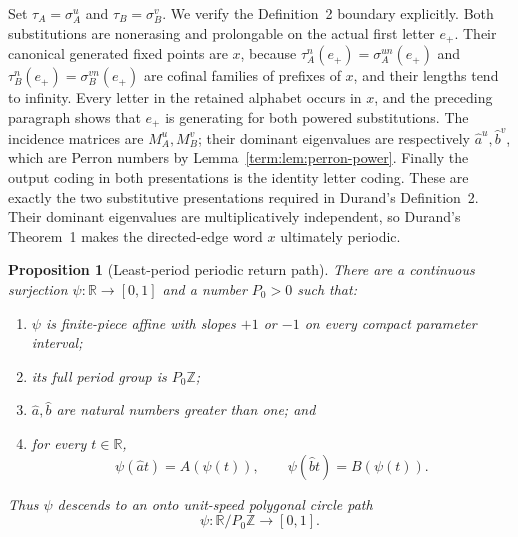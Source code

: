 \documentclass[11pt]{article}
\newtheorem{proposition}[theorem]{Proposition}
\theoremstyle{definition}
\theoremstyle{remark}
\newcommand{\I}{[0,1]}
\begin{document}
Set \(\tau_A=\sigma_A^u\) and \(\tau_B=\sigma_B^v\).  We verify the
Definition~2 boundary explicitly.  Both substitutions are nonerasing and
prolongable on the actual first letter \(e_+\).  Their canonical generated
fixed points are \(x\), because \(\tau_A^n(e_+)=\sigma_A^{un}(e_+)\) and
\(\tau_B^n(e_+)=\sigma_B^{vn}(e_+)\) are cofinal families of prefixes of
\(x\), and their lengths tend to infinity.  Every letter in the retained
alphabet occurs in \(x\), and the preceding paragraph shows that \(e_+\) is
generating for both powered substitutions.  The incidence matrices are
\(M_A^u,M_B^v\); their dominant eigenvalues are respectively
\(\widehat a^u,\widehat b^v\), which are Perron numbers by
Lemma~\ref{term:lem:perron-power}.  Finally the output coding in both
presentations is the identity letter coding.  These are exactly the two
substitutive presentations required in Durand's Definition~2.  Their
dominant eigenvalues are multiplicatively independent, so Durand's
Theorem~1 makes the directed-edge word \(x\) ultimately periodic.

\begin{proposition}[Least-period periodic return path]
\label{term:prop:periodic-return-path}
There are a continuous surjection \(\psi:\mathbb R\to\I\) and a number
\(P_0>0\) such that:
\begin{enumerate}
\item \(\psi\) is finite-piece affine with slopes \(+1\) or \(-1\) on every
compact parameter interval;
\item its full period group is \(P_0\mathbb Z\);
\item \(\widehat a,\widehat b\) are natural numbers greater than one; and
\item for every \(t\in\mathbb R\),
\begin{equation}\label{term:eq:psi-returns}
 \psi(\widehat a t)=A(\psi(t)),\qquad
 \psi(\widehat b t)=B(\psi(t)).
\end{equation}
\end{enumerate}
Thus \(\psi\) descends to an onto unit-speed polygonal circle path
\begin{equation}\label{term:eq:psi-circle}
 \psi\colon\mathbb R/P_0\mathbb Z\longrightarrow\I.
\end{equation}
\end{proposition}
\end{document}
